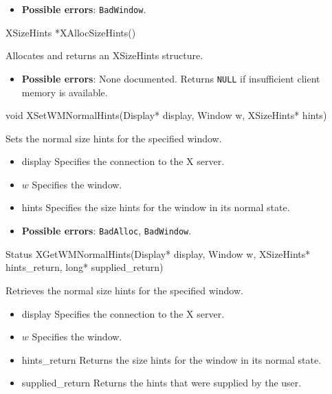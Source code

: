 \documentclass{report}
\begin{document}
\begin{itemize}
            \begin{itemize}
                \item \textbf{Possible errors}: \texttt{BadWindow}.
            \end{itemize}

            \begin{cppcode}
                XSizeHints *XAllocSizeHints()
            \end{cppcode}
            \bigbreak \noindent
            Allocates and returns an XSizeHints structure.

            \begin{itemize}
                \item \textbf{Possible errors}: None documented. Returns \texttt{NULL} if insufficient client memory is available.
            \end{itemize}

            \begin{cppcode}
                void XSetWMNormalHints(Display* display, Window w, XSizeHints* hints)
            \end{cppcode}
            \bigbreak \noindent
            Sets the normal size hints for the specified window.

            \begin{itemize}
                \item display Specifies the connection to the X server.
                \item $w$ Specifies the window.
                \item hints Specifies the size hints for the window in its normal state.
            \end{itemize}

            \begin{itemize}
                \item \textbf{Possible errors}: \texttt{BadAlloc}, \texttt{BadWindow}.
            \end{itemize}

            \begin{cppcode}
            Status XGetWMNormalHints(Display* display, Window w, XSizeHints* hints_return, long* supplied_return)
            \end{cppcode}
            \bigbreak \noindent
            Retrieves the normal size hints for the specified window.

            \begin{itemize}
                \item display Specifies the connection to the X server.
                \item $w$ Specifies the window.
                \item hints\_return Returns the size hints for the window in its normal state.
                \item supplied\_return Returns the hints that were supplied by the user.
            \end{itemize}


\end{itemize}
\end{document}
